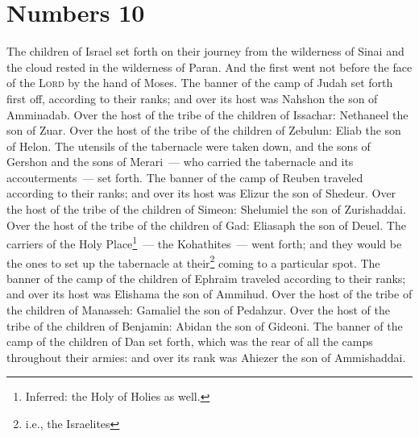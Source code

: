 \section{Numbers 10}\label{Numbers 10}
\begin{enumerate}[align=center]
     The children of Israel set forth on their journey from the wilderness of Sinai and the cloud rested in the wilderness of Paran.%
     And the first went not before the face of the \textsc{Lord} by the hand of Moses.%
     The banner of the camp of Judah set forth first off, according to their ranks; and over its host was Nahshon the son of Amminadab.%
     Over the host of the tribe of the children of Issachar: Nethaneel the son of Zuar.%
     Over the host of the tribe of the children of Zebulun: Eliab the son of Helon.%
     The utensils of the tabernacle were taken down, and the sons of Gershon and the sons of Merari~--- who carried the tabernacle and its accouterments~--- set forth.%
     The banner of the camp of Reuben traveled according to their ranks; and over its host was Elizur the son of Shedeur.%
     Over the host of the tribe of the children of Simeon: Shelumiel the son of Zurishaddai.%
     Over the host of the tribe of the children of Gad: Eliasaph the son of Deuel.%
     The carriers of the Holy Place\footnote{Inferred: the Holy of Holies as well.}~--- the Kohathites~--- went forth; and they would be the ones to set up the tabernacle at their\footnote{i.e., the Israelites} coming to a particular spot.%
     The banner of the camp of the children of Ephraim traveled according to their ranks; and over its host was Elishama the son of Ammihud.%
     Over the host of the tribe of the children of Manasseh: Gamaliel the son of Pedahzur.%
     Over the host of the tribe of the children of Benjamin: Abidan the son of Gideoni.%
     The banner of the camp of the children of Dan set forth, which was the rear of all the camps throughout their armies: and over its rank was Ahiezer the son of Ammishaddai.%

\end{enumerate}
